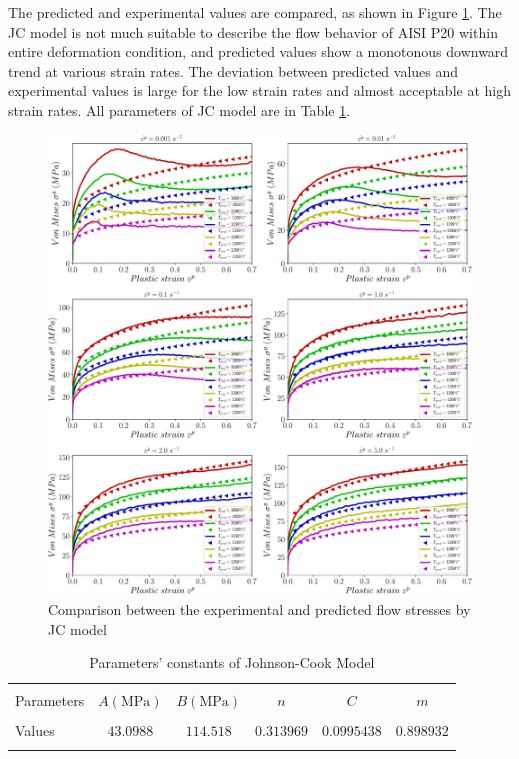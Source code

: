 \documentclass[twoside,english,1p,final,sort&compress]{elsarticle}
\theoremstyle{plain}
\begin{document}
The predicted and experimental values are compared, as shown in Figure \ref{fig:iCorrelationJC}. The JC model is not much suitable to describe the ﬂow behavior of AISI P20 within entire deformation condition, and predicted values show a monotonous downward trend at various strain rates. The deviation between predicted values and experimental values is large for the low strain rates and almost acceptable at high strain rates. All parameters of JC model are in Table \ref{tab: JCparameters}.
\begin{figure}[!ht]
\centering
\includegraphics[width=1.02\columnwidth]
{Figures/CompExpJC}
\caption{Comparison between the experimental and predicted flow stresses by JC model}
\label{fig:iCorrelationJC}
\end{figure}
\begin{table}[h!]
\centering{}
\caption{Parameters' constants of Johnson-Cook Model}
\begin{tabular}{lccccc}
\hline
&         &             &		   &		  &\\
Parameters&$A(\text{MPa})$    &$B(\text{MPa})$        & $n$     & $C$   & $m$       \\
&         &             &		   &	     &	    \\
\hline
Values&$43.0988$&$114.518$& $0.313969$&$0.0995438$&$0.898932$\\
\hline
\label{tab: JCparameters}
\end{tabular}
\end{table}
\end{document}
